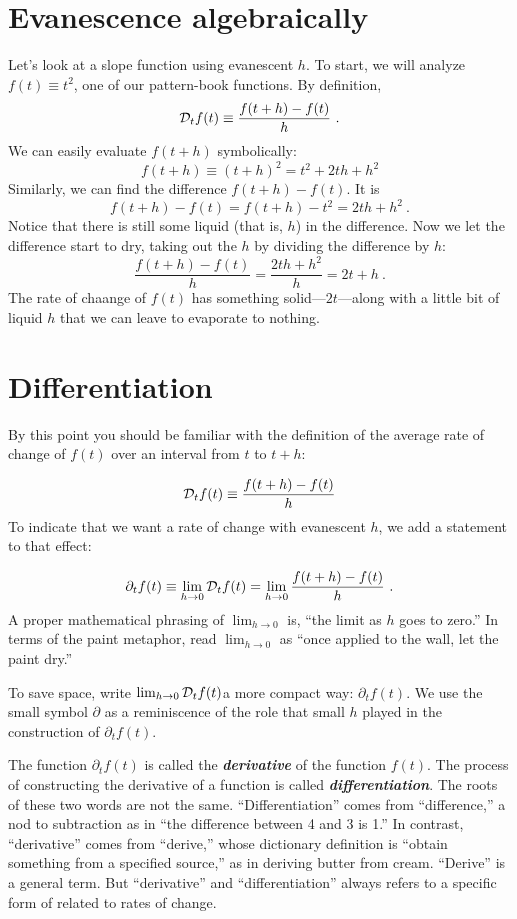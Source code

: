 \documentclass[
  letterpaper,
  DIV=11,
  numbers=noendperiod,
  oneside]{scrreprt}
\begin{document}
\hypertarget{evanescence-algebraically}{%
\section{Evanescence algebraically}\label{evanescence-algebraically}}

Let's look at a slope function using evanescent \(h\). To start, we will
analyze \(f(t) \equiv t^2\), one of our pattern-book functions. By
definition, \[{\cal D}_t f(t) \equiv \frac{f(t+h) - f(t)}{h}\ .\] We can
easily evaluate \(f(t+h)\) symbolically:
\[f(t+h) \equiv (t+h)^2 = t^2 + 2 t h + h^2\] Similarly, we can find the
difference \(f(t+h) - f(t)\). It is
\[f(t+h) - f(t) = f(t+h) - t^2 = 2 t h + h^2\ .\] Notice that there is
still some liquid (that is, \(h\)) in the difference. Now we let the
difference start to dry, taking out the \(h\) by dividing the difference
by \(h\):
\[\frac{f(t+h) - f(t)}{h} = \frac{2 t h + h^2}{h} = 2 t + h\ .\] The
rate of chaange of \(f(t)\) has something solid---\(2 t\)---along with a
little bit of liquid \(h\) that we can leave to evaporate to nothing.

\hypertarget{differentiation}{%
\section{Differentiation}\label{differentiation}}

By this point you should be familiar with the definition of the average
rate of change of \(f(t)\) over an interval from \(t\) to \(t+h\):

\[{\cal D}_t f(t) \equiv \frac{f(t+h) - f(t)}{h}\] To indicate that we
want a rate of change with evanescent \(h\), we add a statement to that
effect:

\[\partial_t f(t) \equiv \lim_{h\rightarrow 0} {\cal D}_t f(t) = \lim_{h\rightarrow0}\frac{f(t+h) - f(t)}{h}\ .\]
A proper mathematical phrasing of \(\lim_{h\rightarrow 0}\) is, ``the
limit as \(h\) goes to zero.'' In terms of the paint metaphor, read
\(\lim_{h\rightarrow 0}\) as ``once applied to the wall, let the paint
dry.''

To save space, write \(\lim_{h\rightarrow 0} {\cal D}_t f(t)\)\in a more
compact way: \(\partial_t f(t)\). We use the small symbol \(\partial\)
as a reminiscence of the role that small \(h\) played in the
construction of \(\partial_t f(t)\).

The function \(\partial_t f(t)\) is called the
\textbf{\emph{derivative}} of the function \(f(t)\). The process of
constructing the derivative of a function is called
\textbf{\emph{differentiation}}. The roots of these two words are not
the same. ``Differentiation'' comes from ``difference,'' a nod to
subtraction as in ``the difference between 4 and 3 is 1.'' In contrast,
``derivative'' comes from ``derive,'' whose dictionary definition is
``obtain something from a specified source,'' as in deriving butter from
cream. ``Derive'' is a general term. But ``derivative'' and
``differentiation'' always refers to a specific form of related to rates
of change.
\end{document}

